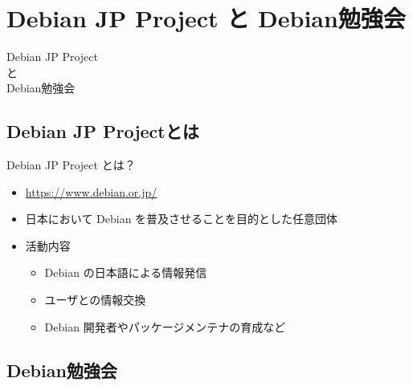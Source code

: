 

\section{Debian JP Project と Debian勉強会}


\begin{frame}
  \begin{center}\Huge{Debian JP Project\\と\\Debian勉強会}\end{center}
\end{frame}

\subsection{Debian JP Projectとは}
  
\begin{frame}{Debian JP Project とは？}

\begin{itemize}
  \item \url{https://www.debian.or.jp/}
  \item 日本において Debian を普及させることを目的とした任意団体
  \item 活動内容
  \begin{itemize}
    \item Debian の日本語による情報発信
    \item ユーザとの情報交換
    \item Debian 開発者やパッケージメンテナの育成など
  \end{itemize}
\end{itemize}

\end{frame}

\subsection{Debian勉強会}

